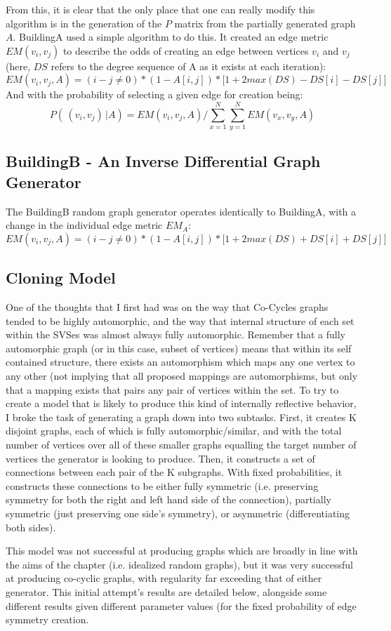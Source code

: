 From this, it is clear that the only place that one can really modify this algorithm is in the generation of the $P$ matrix from the partially generated graph $A$.
BuildingA used a simple algorithm to do this.
It created an edge metric $EM(v_i, v_j)$ to describe the odds of creating an edge between vertices $v_i$ and $v_j$ (here, $DS$ refers to the degree sequence of A as it exists at each iteration):
$$ EM(v_i, v_j, A) = (i - j  \neq 0) * (1 - A[i, j]) * \Big[ 1 + 2 max(DS) - DS[i] - DS[j] \Big] $$
And with the probability of selecting a given edge for creation being:
$$P(\,(v_i, v_j) \,| A) = EM(v_i, v_j, A) / \sum_{x = 1}^{N} \sum_{y = 1}^{N} EM(v_x, v_y, A)$$

\subsection{BuildingB - An Inverse Differential Graph Generator}

The BuildingB random graph generator operates identically to BuildingA, with a change in the individual edge metric $EM_A$:
$$ EM(v_i, v_j, A) = (i - j  \neq 0) * (1 - A[i, j]) * \Big[ 1 + 2 max(DS) + DS[i] + DS[j] \Big] $$

\subsection{Cloning Model}
One of the thoughts that I first had was on the way that Co-Cycles graphs tended to be highly automorphic, and the way that internal structure of each set within the SVSes was almost always fully automorphic.
Remember that a fully automorphic graph (or in this case, subset of vertices) means that within its self contained structure, there exists an automorphism which maps any one vertex to any other (not implying that all proposed mappings are automorphisms, but only that a mapping exists that pairs any pair of vertices within the set.
To try to create a model that is likely to produce this kind of internally reflective behavior, I broke the task of generating a graph down into two subtasks.
First, it creates K disjoint graphs, each of which is fully automorphic/similar, and with the total number of vertices over all of these smaller graphs equalling the target number of vertices the generator is looking to produce.
Then, it constructs a set of connections between each pair of the K subgraphs.
With fixed probabilities, it constructs these connections to be either fully symmetric (i.e. preserving symmetry for both the right and left hand side of the connection), partially symmetric (just preserving one side's symmetry), or asymmetric (differentiating both sides).

This model was not successful at producing graphs which are broadly in line with the aims of the chapter (i.e. idealized random graphs), but it was very successful at producing co-cyclic graphs, with regularity far exceeding that of either generator. This initial attempt's results are detailed below, alongside some different results given different parameter values (for the fixed probability of edge symmetry creation.

